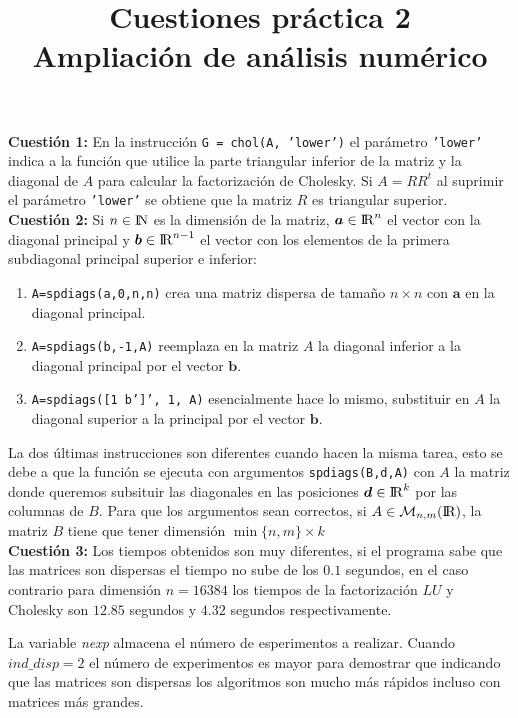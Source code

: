 \documentclass[12pt]{article}
\title{\textbf{Cuestiones práctica 2\\ {\small Ampliación de análisis numérico}}}
\date{}
\author{}
\newcommand{\RR}{\rm I\!R}
\newcommand{\NN}{{\rm I\!N}}
\theoremstyle{definition}
\begin{document}
	\maketitle
	
	\noindent\textbf{Cuestión 1:} En la instrucción \texttt{G = chol(A, 'lower')} el parámetro \texttt{'lower'} indica a la función que utilice la parte triangular inferior de la matriz  y la diagonal de $A$ para calcular la factorización de Cholesky. Si $A = R R^t$ al suprimir el parámetro \texttt{'lower'} se obtiene que la matriz $R$ es triangular superior. \\

	\noindent\textbf{Cuestión 2:} Si $n\in\NN$ es la dimensión de la matriz, $\bm{a}\in{\RR}^n$ el vector con la diagonal principal y $\bm{b}\in{\RR}^{n-1}$ el vector con los elementos de la primera subdiagonal principal superior e inferior:
	\begin{enumerate}
		\item \texttt{A=spdiags(a,0,n,n)} crea una matriz dispersa de tamaño $n\times n$ con $\bm{a}$ en la diagonal principal.
		\item \texttt{A=spdiags(b,-1,A)} reemplaza en la matriz $A$ la diagonal inferior a la diagonal principal por el vector $\bm{b}$.
		\item \texttt{A=spdiags([1 b']', 1, A)} esencialmente hace lo mismo, substituir en $A$ la diagonal superior a la principal por el vector $\bm{b}$.
	
	\end{enumerate}
	
	La dos últimas instrucciones son diferentes cuando hacen la misma tarea, esto se debe a que la función se ejecuta con argumentos \texttt{spdiags(B,d,A)} con $A$ la matriz donde queremos subsituir las diagonales en las posiciones $\bm{d}\in{\RR}^k$ por las columnas de $B$. Para que los argumentos sean correctos, si $A\in\mathcal{M}_{n, m}(\RR)$, la matriz $B$ tiene que tener dimensión $\min\{n, m\}\times k$ \\
		
	\noindent\textbf{Cuestión 3:} Los tiempos obtenidos son muy diferentes, si el programa sabe que las matrices son dispersas el tiempo no sube de los $0.1$ segundos, en el caso contrario para dimensión $n=16384$ los tiempos de la factorización $LU$ y Cholesky son $12.85$ segundos y $4.32$ segundos respectivamente.
	
	La variable \textit{nexp} almacena el número de esperimentos a realizar. Cuando $ind\_disp=2$ el número de experimentos es mayor para demostrar que indicando que las matrices son dispersas los algoritmos son mucho más rápidos incluso con matrices más grandes.
	
\end{document}
